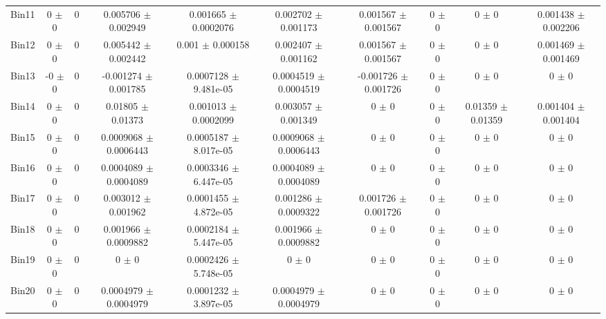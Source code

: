 \begin{tabular}{@{\extracolsep{4pt}}lccccccccc@{}}
     Bin11 & 0 $\pm$ 0 & 0 & 0.005706 $\pm$ 0.002949 & 0.001665 $\pm$ 0.0002076 & 0.002702 $\pm$ 0.001173 & 0.001567 $\pm$ 0.001567 & 0 $\pm$ 0 & 0 $\pm$ 0 & 0.001438 $\pm$ 0.002206 \\ 
     Bin12 & 0 $\pm$ 0 & 0 & 0.005442 $\pm$ 0.002442 & 0.001 $\pm$ 0.000158 & 0.002407 $\pm$ 0.001162 & 0.001567 $\pm$ 0.001567 & 0 $\pm$ 0 & 0 $\pm$ 0 & 0.001469 $\pm$ 0.001469 \\ 
     Bin13 & -0 $\pm$ 0 & 0 & -0.001274 $\pm$ 0.001785 & 0.0007128 $\pm$ 9.481e-05 & 0.0004519 $\pm$ 0.0004519 & -0.001726 $\pm$ 0.001726 & 0 $\pm$ 0 & 0 $\pm$ 0 & 0 $\pm$ 0 \\ 
     Bin14 & 0 $\pm$ 0 & 0 & 0.01805 $\pm$ 0.01373 & 0.001013 $\pm$ 0.0002099 & 0.003057 $\pm$ 0.001349 & 0 $\pm$ 0 & 0 $\pm$ 0 & 0.01359 $\pm$ 0.01359 & 0.001404 $\pm$ 0.001404 \\ 
     Bin15 & 0 $\pm$ 0 & 0 & 0.0009068 $\pm$ 0.0006443 & 0.0005187 $\pm$ 8.017e-05 & 0.0009068 $\pm$ 0.0006443 & 0 $\pm$ 0 & 0 $\pm$ 0 & 0 $\pm$ 0 & 0 $\pm$ 0 \\ 
     Bin16 & 0 $\pm$ 0 & 0 & 0.0004089 $\pm$ 0.0004089 & 0.0003346 $\pm$ 6.447e-05 & 0.0004089 $\pm$ 0.0004089 & 0 $\pm$ 0 & 0 $\pm$ 0 & 0 $\pm$ 0 & 0 $\pm$ 0 \\ 
     Bin17 & 0 $\pm$ 0 & 0 & 0.003012 $\pm$ 0.001962 & 0.0001455 $\pm$ 4.872e-05 & 0.001286 $\pm$ 0.0009322 & 0.001726 $\pm$ 0.001726 & 0 $\pm$ 0 & 0 $\pm$ 0 & 0 $\pm$ 0 \\ 
     Bin18 & 0 $\pm$ 0 & 0 & 0.001966 $\pm$ 0.0009882 & 0.0002184 $\pm$ 5.447e-05 & 0.001966 $\pm$ 0.0009882 & 0 $\pm$ 0 & 0 $\pm$ 0 & 0 $\pm$ 0 & 0 $\pm$ 0 \\ 
     Bin19 & 0 $\pm$ 0 & 0 & 0 $\pm$ 0 & 0.0002426 $\pm$ 5.748e-05 & 0 $\pm$ 0 & 0 $\pm$ 0 & 0 $\pm$ 0 & 0 $\pm$ 0 & 0 $\pm$ 0 \\ 
     Bin20 & 0 $\pm$ 0 & 0 & 0.0004979 $\pm$ 0.0004979 & 0.0001232 $\pm$ 3.897e-05 & 0.0004979 $\pm$ 0.0004979 & 0 $\pm$ 0 & 0 $\pm$ 0 & 0 $\pm$ 0 & 0 $\pm$ 0 \\ 
\hline\hline
  \end{tabular}

